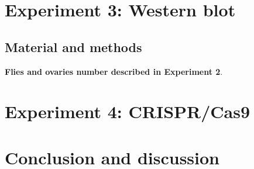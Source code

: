 \documentclass{article}
\begin{document}
\newpage
\section*{Experiment 3: Western blot}
\subsection*{Material and methods}
\textbf{Flies and ovaries number described in Experiment 2}.

\newpage
\section*{Experiment 4: CRISPR/Cas9}


\newpage
\section*{Conclusion and discussion}









\end{document}

